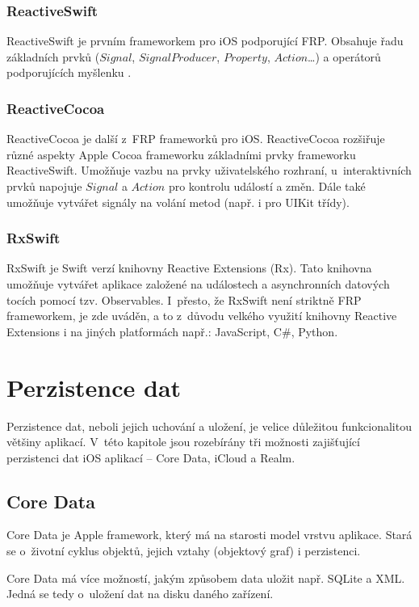 \documentclass[thesis=M,czech]{FITthesis}[2012/06/26]
\begin{document}
\subsubsection{ReactiveSwift}
ReactiveSwift je prvním frameworkem pro iOS podporující FRP. Obsahuje řadu základních prvků ($Signal$, $SignalProducer$, $Property$, $Action$\ldots) a operátorů podporujících myšlenku . \cite{ReactiveSwift}

\subsubsection{ReactiveCocoa}
ReactiveCocoa je další z~FRP frameworků pro iOS. ReactiveCocoa rozšiřuje různé aspekty Apple Cocoa frameworku základními prvky frameworku ReactiveSwift. Umožňuje vazbu na prvky uživatelského rozhraní, u~interaktivních prvků napojuje $Signal$ a $Action$ pro kontrolu událostí a změn. Dále také umožňuje vytvářet signály na volání metod (např. i pro UIKit třídy). \cite{ReactiveCocoa}

\subsubsection{RxSwift}
RxSwift je Swift verzí knihovny Reactive Extensions (Rx). \cite{RxSwift} Tato knihovna umožňuje vytvářet aplikace založené na událostech a asynchronních datových tocích pomocí tzv. Observables. \cite{RxNET} I~přesto, že RxSwift není striktně FRP frameworkem, \cite{ReactiveExtensionsDocs} je zde uváděn, a to z~důvodu velkého využití knihovny Reactive Extensions i na jiných platformách např.: JavaScript, C\#, Python. \cite{ReactiveExtensions}

\section{Perzistence dat}
Perzistence dat, neboli jejich uchování a uložení, je velice důležitou funkcionalitou většiny aplikací. V~této kapitole jsou rozebírány tři možnosti zajišťující perzistenci dat iOS aplikací -- Core Data, iCloud a Realm.

\subsection{Core Data}
Core Data je Apple framework, který má na starosti model vrstvu aplikace. Stará se o~životní cyklus objektů, jejich vztahy (objektový graf) i perzistenci. \cite{coredata}

Core Data má více možností, jakým způsobem data uložit např. SQLite a XML. Jedná se tedy o~uložení dat na disku daného zařízení.  \cite{CoreDataPersistentTypes}
\end{document}
